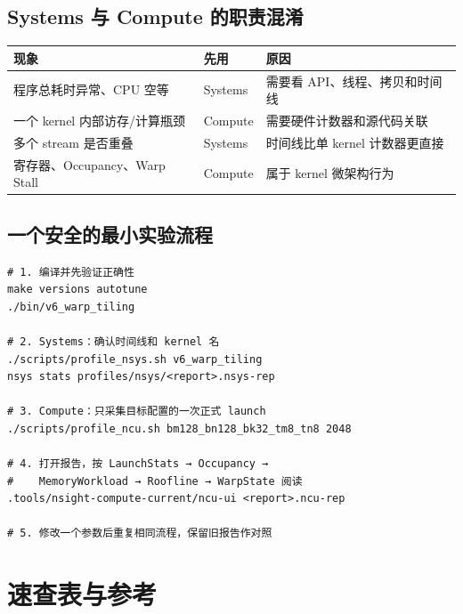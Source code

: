 \documentclass[UTF8,11pt,a4paper,fontset=fandol]{ctexart}
\begin{document}
\subsection{Systems 与 Compute 的职责混淆}
\begin{table}[H]\centering\small
\begin{tabularx}{\linewidth}{lXX}
\toprule
现象 & 先用 & 原因\\\midrule
程序总耗时异常、CPU 空等 & Systems & 需要看 API、线程、拷贝和时间线\\
一个 kernel 内部访存/计算瓶颈 & Compute & 需要硬件计数器和源代码关联\\
多个 stream 是否重叠 & Systems & 时间线比单 kernel 计数器更直接\\
寄存器、Occupancy、Warp Stall & Compute & 属于 kernel 微架构行为\\
\bottomrule
\end{tabularx}
\end{table}

\subsection{一个安全的最小实验流程}
\begin{lstlisting}[style=shell]
# 1. 编译并先验证正确性
make versions autotune
./bin/v6_warp_tiling

# 2. Systems：确认时间线和 kernel 名
./scripts/profile_nsys.sh v6_warp_tiling
nsys stats profiles/nsys/<report>.nsys-rep

# 3. Compute：只采集目标配置的一次正式 launch
./scripts/profile_ncu.sh bm128_bn128_bk32_tm8_tn8 2048

# 4. 打开报告，按 LaunchStats → Occupancy →
#    MemoryWorkload → Roofline → WarpState 阅读
.tools/nsight-compute-current/ncu-ui <report>.ncu-rep

# 5. 修改一个参数后重复相同流程，保留旧报告作对照
\end{lstlisting}

\section{速查表与参考}
\end{document}
